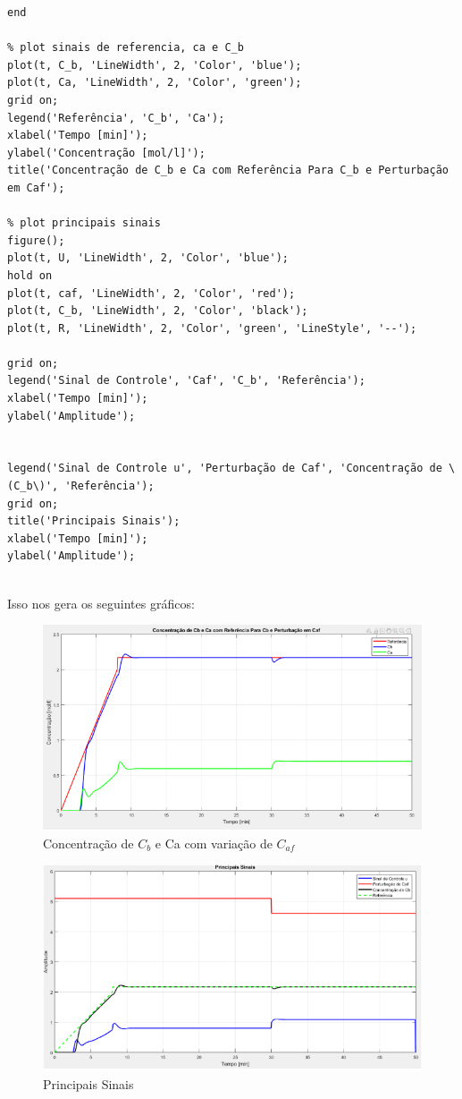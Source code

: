 \documentclass[a4paper,12pt]{article}
\begin{document}
\begin{lstlisting}[caption={Código MATLAB para simulação de controle}]
end

% plot sinais de referencia, ca e C_b
plot(t, C_b, 'LineWidth', 2, 'Color', 'blue');
plot(t, Ca, 'LineWidth', 2, 'Color', 'green');
grid on;
legend('Referência', 'C_b', 'Ca');
xlabel('Tempo [min]');
ylabel('Concentração [mol/l]');
title('Concentração de C_b e Ca com Referência Para C_b e Perturbação em Caf');

% plot principais sinais
figure();
plot(t, U, 'LineWidth', 2, 'Color', 'blue');
hold on
plot(t, caf, 'LineWidth', 2, 'Color', 'red');
plot(t, C_b, 'LineWidth', 2, 'Color', 'black');
plot(t, R, 'LineWidth', 2, 'Color', 'green', 'LineStyle', '--');

grid on;
legend('Sinal de Controle', 'Caf', 'C_b', 'Referência');
xlabel('Tempo [min]');
ylabel('Amplitude');


legend('Sinal de Controle u', 'Perturbação de Caf', 'Concentração de \(C_b\)', 'Referência');
grid on;
title('Principais Sinais');
xlabel('Tempo [min]');
ylabel('Amplitude');


\end{lstlisting}




Isso nos gera os seguintes gráficos:

\begin{figure} [H]
    \centering
    \includegraphics[width=0.8\linewidth]{image4.png}
    \caption{Concentração de \(C_b\) e Ca com variação de \(C_{af}\)}
    
\end{figure}

\begin{figure} [H]
    \centering
    \includegraphics[width=0.8\linewidth]{image5.png}
    \caption{Principais Sinais}
    
\end{figure}
\end{document}

